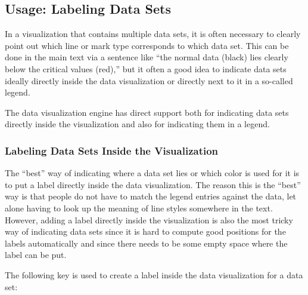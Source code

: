 \subsection{Usage: Labeling Data Sets}

In a visualization that contains multiple data sets, it is often
necessary to clearly point out which line or mark type corresponds to
which data set. This can be done in the main text via a sentence like
``the normal data (black) lies clearly below the critical values
(red),'' but it often a good idea to indicate data sets ideally
directly inside the data visualization or directly next to it in a
so-called legend.

The data visualization engine has direct support both for indicating
data sets directly inside the visualization and also for indicating
them in a legend.

\subsubsection{Labeling Data Sets Inside the Visualization}

The ``best'' way of indicating where a data set lies or which color is
used for it is to put a label directly inside the data
visualization. The reason this is the ``best'' way is that people do
not have to match the legend entries against the data, let alone
having to look up the meaning of line styles somewhere in the
text. However, adding a label directly inside the visualization is
also the most tricky way of indicating data sets since it is hard to
compute good positions for the labels automatically and since there
needs to be some empty space where the label can be put.

The following key is used to create a label inside the data
visualization for a data set:

